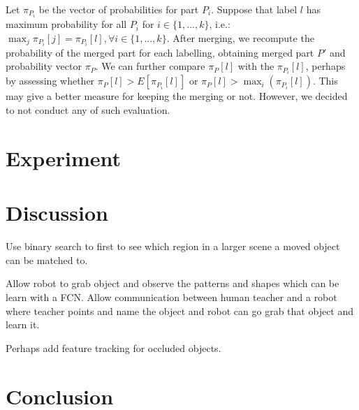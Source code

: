 \documentclass{article}
\begin{document}
Let $\pi_{P_i}$ be the vector of probabilities for part $P_i$. Suppose that label $l$ has maximum probability for all $P_i$ for $i\in \{1,...,k\}$, i.e.: $\max_j \pi_{P_i}[j] = \pi_{P_i}[l],  \forall i\in \{1,...,k\}$. After merging, we recompute the probability of the merged part for each labelling, obtaining merged part $P'$ and probability vector $\pi_P$. We can further compare $\pi_P[l]$ with the $\pi_{P_i}[l]$, perhaps by assessing whether $\pi_P[l] > E[\pi_{P_i}[l]]$ or $\pi_P[l] > \max_i (\pi_{P_i}[l])$. This may give a better measure for keeping the merging or not. However, we decided to not conduct any of such evaluation.

\section{Experiment}\label{sec:exp}


\section{Discussion}

Use binary search to first to see which region in a larger scene a moved object can be matched to.

Allow robot to grab object and observe the patterns and shapes which can be learn with a FCN. Allow communication between human teacher and a robot where teacher points and name the object and robot can go grab that object and learn it.  

Perhaps add feature tracking for occluded objects. 

\section{Conclusion}
\end{document}
